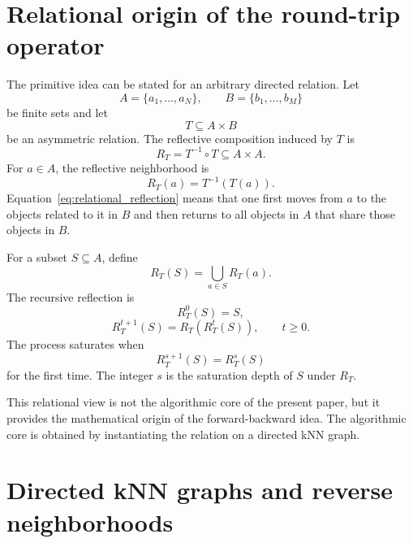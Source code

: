\documentclass[pdflatex,sn-mathphys-num]{sn-jnl}
\theoremstyle{thmstyleone}
\theoremstyle{thmstyletwo}
\theoremstyle{thmstylethree}
\begin{document}
\section{Relational origin of the round-trip operator}\label{sec:relational_origin}

The primitive idea can be stated for an arbitrary directed relation. Let
\begin{equation}
A=\{a_1,\ldots,a_N\},\qquad B=\{b_1,\ldots,b_M\}
\end{equation}
be finite sets and let
\begin{equation}
T\subseteq A\times B
\end{equation}
be an asymmetric relation. The reflective composition induced by $T$ is
\begin{equation}
R_T=T^{-1}\circ T\subseteq A\times A.
\end{equation}
For $a\in A$, the reflective neighborhood is
\begin{equation}
R_T(a)=T^{-1}(T(a)).
\label{eq:relational_reflection}
\end{equation}
Equation~\eqref{eq:relational_reflection} means that one first moves from $a$ to the objects related to it in $B$ and then returns to all objects in $A$ that share those objects in $B$.

For a subset $S\subseteq A$, define
\begin{equation}
R_T(S)=\bigcup_{a\in S}R_T(a).
\end{equation}
The recursive reflection is
\begin{equation}
R_T^0(S)=S,
\end{equation}
\begin{equation}
R_T^{t+1}(S)=R_T(R_T^t(S)),\qquad t\geq 0.
\label{eq:relational_iteration}
\end{equation}
The process saturates when
\begin{equation}
R_T^{s+1}(S)=R_T^s(S)
\end{equation}
for the first time. The integer $s$ is the saturation depth of $S$ under $R_T$.

This relational view is not the algorithmic core of the present paper, but it provides the mathematical origin of the forward-backward idea. The algorithmic core is obtained by instantiating the relation on a directed kNN graph.

\section{Directed kNN graphs and reverse neighborhoods}\label{sec:knn_graph}
\end{document}
